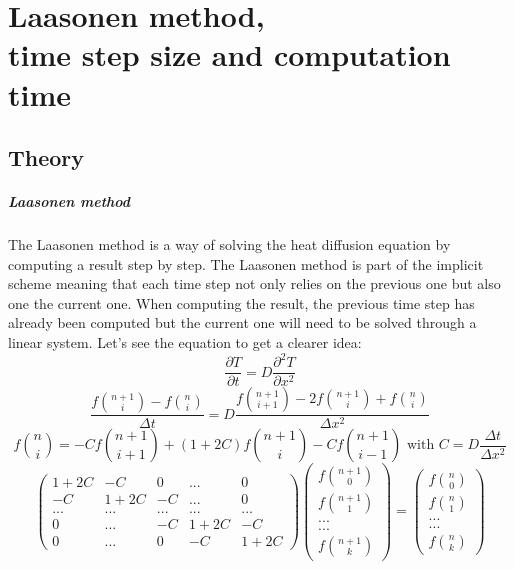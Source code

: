 \documentclass[12pt, a4paper]{report}
\begin{document}
\chapter{Laasonen method,\\ time step size and computation time}

\section{Theory}
\paragraph{Laasonen method}
The Laasonen method is a way of solving the heat diffusion equation by computing a result step by step. The Laasonen method is part of the implicit scheme meaning that each time step not only relies on the previous one but also one the current one. When computing the result, the previous time step has already been computed but the current one will need to be solved through a linear system. Let's see the equation to get a clearer idea:
\begin{equation}\frac{\partial T}{\partial t} = D\frac{\partial^2T }{\partial x^2}
\end{equation} 
\begin{equation}\frac{f\binom{n+1}{i} - f\binom{n}{i}}{\Delta t} = D\frac{f\binom{n+1}{i+1} - 2f\binom{n+1}{i}+ f\binom{n}{i}}{\Delta x^{2}}
\end{equation} 
\begin{equation}f\binom{n}{i} = -Cf\binom{n+1}{i+1}+(1+2C)f\binom{n+1}{i}-Cf\binom{n+1}{i-1}
   \text{ with }
C = D\frac{\Delta t}{\Delta x^{2}}
\end{equation}
\begin{equation}
\begin{pmatrix}
1+2C & -C & 0 & ... & 0\\
-C & 1+2C & -C& ... & 0\\
...&...&...&...&...\\
 0 & ...& -C &1+2C & -C \\
0 & ... &  0& -C & 1+2C
\end{pmatrix}
\begin{pmatrix}
f\binom{n+1}{0}\\
f\binom{n+1}{1}\\
...\\
...\\
f\binom{n+1}{k}
\end{pmatrix}
=
\begin{pmatrix}
f\binom{n}{0}\\
f\binom{n}{1}\\
...\\
...\\
f\binom{n}{k}
\end{pmatrix}
\end{equation}
\end{document}
